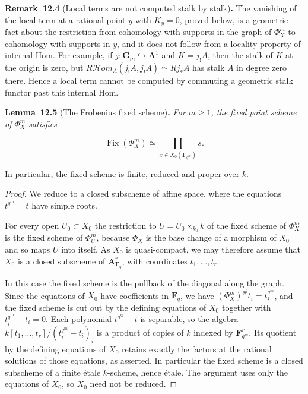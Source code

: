\documentclass[11pt]{article}
\newenvironment{bpstatement}[2]{\par\addvspace{0.6\baselineskip}\noindent\textbf{#1}#2\textbf{.}\enspace\ignorespaces}
  {\par\addvspace{0.4\baselineskip}}
\newenvironment{bpstatementit}[2]{\begin{bpstatement}{#1}{#2}\itshape\ignorespaces}{\end{bpstatement}}
\providecommand{\Fix}{}\renewcommand{\Fix}{\operatorname{Fix}}
\providecommand{\cHom}{}\renewcommand{\cHom}{R\mathcal{H}\!om}
\begin{document}
\label{bp239}%
\begin{bpstatement}{Remark~12.4}{ (Local terms are not computed stalk by stalk)}
The vanishing of the local term at a rational point \(y\) with \(K_{\bar y}=0\), proved below, is a geometric fact about the restriction from cohomology with supports in the graph of \(\Phi_X^m\) to cohomology with supports in \(y\), and it does not follow from a locality property of internal Hom. For example, if \(j:\mathbf G_m\hookrightarrow\mathbf A^1\) and \(K=j_!A\), then the stalk of \(K\) at the origin is zero, but \(\cHom_A(j_!A,j_!A)\simeq Rj_*A\) has stalk \(A\) in degree zero there. Hence a local term cannot be computed by commuting a geometric stalk functor past this internal Hom.
\end{bpstatement}

\label{bp240}%
\begin{bpstatementit}{Lemma~12.5}{ (The Frobenius fixed scheme)}
For \(m\geq1\), the fixed point scheme of \(\Phi_X^m\) satisfies

\[
\Fix(\Phi_X^m)
\simeq\coprod_{x\in X_0(\mathbf F_{q^m})}s.
\]

In particular, the fixed scheme is finite, reduced and proper over \(k\).
\end{bpstatementit}

\begin{proof}[{Proof}]\label{bp241}%
We reduce to a closed subscheme of affine space, where the equations \(t^{q^m}=t\) have simple roots.

For every open \(U_0\subset X_0\) the restriction to \(U=U_0\times_{k_0}k\) of the fixed scheme of \(\Phi_X^m\) is the fixed scheme of \(\Phi_U^m\), because \(\Phi_X\) is the base change of a morphism of \(X_0\) and so maps \(U\) into itself. As \(X_0\) is quasi-compact, we may therefore assume that \(X_0\) is a closed subscheme of \(\mathbf A^r_{\mathbf F_q}\), with coordinates \(t_1,\ldots,t_r\).

In this case the fixed scheme is the pullback of the diagonal along the graph. Since the equations of \(X_0\) have coefficients in \(\mathbf F_q\), we have \((\Phi_X^m)^\#t_i=t_i^{q^m}\), and the fixed scheme is cut out by the defining equations of \(X_0\) together with \(t_i^{q^m}-t_i=0\). Each polynomial \(t^{q^m}-t\) is separable, so the algebra \(k[t_1,\ldots,t_r]/(t_i^{q^m}-t_i)_i\) is a product of copies of \(k\) indexed by \(\mathbf F_{q^m}^r\). Its quotient by the defining equations of \(X_0\) retains exactly the factors at the rational solutions of those equations, as asserted. In particular the fixed scheme is a closed subscheme of a finite étale \(k\)-scheme, hence étale. The argument uses only the equations of \(X_0\), so \(X_0\) need not be reduced.
\end{proof}
\end{document}
